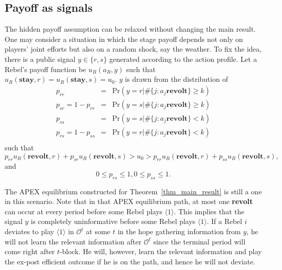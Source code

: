 \documentclass[12pt,letter]{article}
\newcommand{\Omicron}{\mathcal{O}}
\theoremstyle{definition}
\theoremstyle{remark}
\theoremstyle{claim}
\begin{document}
\subsection{Payoff as signals}
The hidden payoff assumption can be relaxed without changing the main result. One may consider a situation in which the stage payoff depends not only on players' joint efforts but also on a random shock, say the weather. To fix the idea, there is a public signal $y\in \{r,s\}$ generated according to the action profile. Let a Rebel's payoff function be $u_{R}(a_{R},y)$ such that $u_{R}(\textbf{stay},r)=u_{R}(\textbf{stay},s)=u_0$. $y$ is drawn from the distribution of 
\begin{eqnarray*}
p_{rr} &=& \mathrm {Pr}(y=r|\#\{j:a_j\textbf{revolt}\}\geq k) \\
p_{sr}=1-p_{rr} &=& \mathrm {Pr}(y=s|\#\{j:a_j\textbf{revolt}\}\geq k) \\
p_{ss} &=& \mathrm {Pr}(y=s|\#\{j:a_j\textbf{revolt}\}< k) \\
p_{rs}=1-p_{ss} &=& \mathrm {Pr}(y=r|\#\{j:a_j\textbf{revolt}\}< k) \\
\end{eqnarray*}
such that
\begin{equation*}
p_{rr}u_{R}(\textbf{revolt}, r)+p_{sr}u_{R}(\textbf{revolt}, s)>u_0>p_{rr}u_{R}(\textbf{revolt}, r)+p_{ss}u_{R}(\textbf{revolt}, s),
\end{equation*}
and
\begin{equation*}
0\leq p_{rs}\leq 1,0\leq p_{ss}\leq 1.
\end{equation*}

The APEX equilibrium constructed for Theorem~\ref{thm_main_result} is still a one in this scenario. Note that in that APEX equilibrium path, at most one \textbf{revolt} can occur at every period before some Rebel plays $\langle 1 \rangle$. This implies that the signal $y$ is completely uninformative before some Rebel plays $\langle 1 \rangle$. If a Rebel $i$ deviates to play $\langle 1 \rangle$ in $\Omicron^t$ at some $t$ in the hope gathering information from $y$, he will not learn the relevant information after $\Omicron^t$ since the terminal period will come right after $t$-block. He will, however, learn the relevant information and play the ex-post efficient outcome if he is on the path, and hence he will not deviate.

\end{document}
